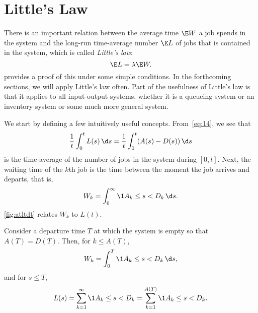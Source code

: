 \section{Little's Law}
\label{sec:littles-law}



There is an important relation between the average time $\E W$ a job
spends in the system and the long-run time-average number $\E L$ of jobs
that is contained in the system, which is called \emph{Little's law}:
\begin{equation}\label{eq:53}
 \E L = \lambda \E W.
\end{equation}
 provides a proof of this under some simple conditions.
In the forthcoming sections, we will apply Little's law often.
Part of the usefulness of Little's law is that it applies to all input-output systems, whether it is a queueing system or an inventory system or some much more general system.

We start by defining a few intuitively useful concepts. From~\cref{eq:14}, we see that
\begin{equation*}
\frac 1 t\int_0^t L(s)\, \d s = \frac 1 t\int_0^t (A(s)-D(s)) \, \d s
\end{equation*}
is the time-average of the number of jobs in the system during
$[0,t]$.
Next, the waiting time of the $k$th job is the time between the moment the
job arrives and departs, that is, 
\begin{equation*}
 W_k = \int_0^\infty \1{A_k \leq s < D_k}\,\d s.
\end{equation*}
\cref{fig:atltdt}  relates $W_k$ to $L(t)$.

Consider a departure time $T$ at which the system is empty so that $A(T) = D(T)$.
Then, for $k\leq A(T)$, 
\begin{equation*}
 W_k = \int_0^T \1{A_k \leq s < D_k}\,\d s,
\end{equation*}
and for $s\leq T$,
\begin{equation*}
L(s) = \sum_{k=1}^\infty \1{A_k \leq s < D_k} = \sum_{k=1}^{A(T)}\1{A_k \leq s < D_k}.
\end{equation*}

